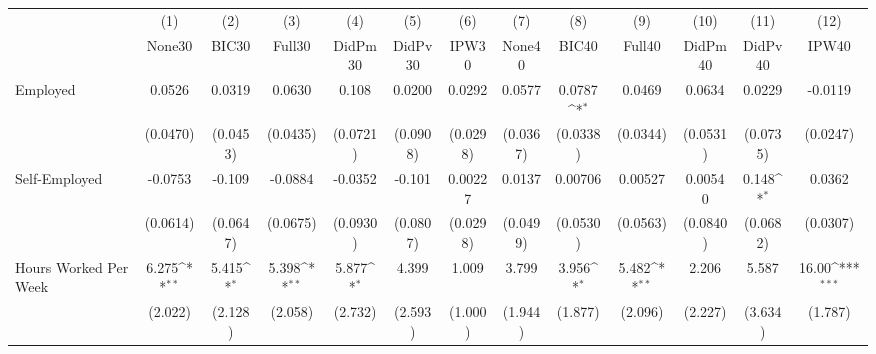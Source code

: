 {
\def\sym#1{\ifmmode^{#1}\else\(^{#1}\)\fi}
\begin{tabular}{l*{12}{c}}
\toprule
            &\multicolumn{1}{c}{(1)}&\multicolumn{1}{c}{(2)}&\multicolumn{1}{c}{(3)}&\multicolumn{1}{c}{(4)}&\multicolumn{1}{c}{(5)}&\multicolumn{1}{c}{(6)}&\multicolumn{1}{c}{(7)}&\multicolumn{1}{c}{(8)}&\multicolumn{1}{c}{(9)}&\multicolumn{1}{c}{(10)}&\multicolumn{1}{c}{(11)}&\multicolumn{1}{c}{(12)}\\
            &\multicolumn{1}{c}{None30}&\multicolumn{1}{c}{BIC30}&\multicolumn{1}{c}{Full30}&\multicolumn{1}{c}{DidPm30}&\multicolumn{1}{c}{DidPv30}&\multicolumn{1}{c}{IPW30}&\multicolumn{1}{c}{None40}&\multicolumn{1}{c}{BIC40}&\multicolumn{1}{c}{Full40}&\multicolumn{1}{c}{DidPm40}&\multicolumn{1}{c}{DidPv40}&\multicolumn{1}{c}{IPW40}\\
\midrule
Employed    &      0.0526         &      0.0319         &      0.0630         &       0.108         &      0.0200         &      0.0292         &      0.0577         &      0.0787\sym{*}  &      0.0469         &      0.0634         &      0.0229         &     -0.0119         \\
            &    (0.0470)         &    (0.0453)         &    (0.0435)         &    (0.0721)         &    (0.0908)         &    (0.0298)         &    (0.0367)         &    (0.0338)         &    (0.0344)         &    (0.0531)         &    (0.0735)         &    (0.0247)         \\
\addlinespace
Self-Employed&     -0.0753         &      -0.109         &     -0.0884         &     -0.0352         &      -0.101         &     0.00227         &      0.0137         &     0.00706         &     0.00527         &     0.00540         &       0.148\sym{*}  &      0.0362         \\
            &    (0.0614)         &    (0.0647)         &    (0.0675)         &    (0.0930)         &    (0.0807)         &    (0.0298)         &    (0.0499)         &    (0.0530)         &    (0.0563)         &    (0.0840)         &    (0.0682)         &    (0.0307)         \\
\addlinespace
Hours Worked Per Week&       6.275\sym{**} &       5.415\sym{*}  &       5.398\sym{**} &       5.877\sym{*}  &       4.399         &       1.009         &       3.799         &       3.956\sym{*}  &       5.482\sym{**} &       2.206         &       5.587         &       16.00\sym{***}\\
            &     (2.022)         &     (2.128)         &     (2.058)         &     (2.732)         &     (2.593)         &     (1.000)         &     (1.944)         &     (1.877)         &     (2.096)         &     (2.227)         &     (3.634)         &     (1.787)         \\

\end{tabular}}
